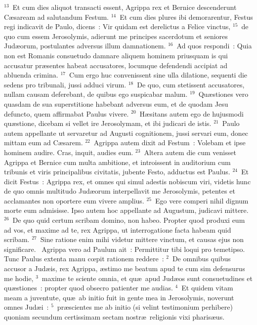 ${}^{13}$~Et cum dies aliquot transacti essent, Agrippa rex et Bernice descenderunt C\ae saream ad salutandum Festum.
${}^{14}$~Et cum dies plures ibi demorarentur, Festus regi indicavit de Paulo, dicens~: Vir quidam est derelictus a Felice vinctus,
${}^{15}$~de quo cum essem Jerosolymis, adierunt me principes sacerdotum et seniores Jud\ae orum, postulantes adversus illum damnationem.
${}^{16}$~Ad quos respondi~: Quia non est Romanis consuetudo damnare aliquem hominem priusquam is qui accusatur pr\ae sentes habeat accusatores, locumque defendendi accipiat ad abluenda crimina.
${}^{17}$~Cum ergo huc convenissent sine ulla dilatione, sequenti die sedens pro tribunali, jussi adduci virum.
${}^{18}$~De quo, cum stetissent accusatores, nullam causam deferebant, de quibus ego suspicabar malum.
${}^{19}$~Qu\ae stiones vero quasdam de sua superstitione habebant adversus eum, et de quodam Jesu defuncto, quem affirmabat Paulus vivere.
${}^{20}$~H\ae sitans autem ego de hujusmodi qu\ae stione, dicebam si vellet ire Jerosolymam, et ibi judicari de istis.
${}^{21}$~Paulo autem appellante ut servaretur ad Augusti cognitionem, jussi servari eum, donec mittam eum ad C\ae sarem.
${}^{22}$~Agrippa autem dixit ad Festum~: Volebam et ipse hominem audire. Cras, inquit, audies eum.
${}^{23}$~Altera autem die cum venisset Agrippa et Bernice cum multa ambitione, et introissent in auditorium cum tribunis et viris principalibus civitatis, jubente Festo, adductus est Paulus.
${}^{24}$~Et dicit Festus~: Agrippa rex, et omnes qui simul adestis nobiscum viri, videtis hunc de quo omnis multitudo Jud\ae orum interpellavit me Jerosolymis, petentes et acclamantes non oportere eum vivere amplius.
${}^{25}$~Ego vere comperi nihil dignum morte eum admisisse. Ipso autem hoc appellante ad Augustum, judicavi mittere.
${}^{26}$~De quo quid certum scribam domino, non habeo. Propter quod produxi eum ad vos, et maxime ad te, rex Agrippa, ut interrogatione facta habeam quid scribam.
${}^{27}$~Sine ratione enim mihi videtur mittere vinctum, et causas ejus non significare.
~Agrippa vero ad Paulum ait~: Permittitur tibi loqui pro temetipso. Tunc Paulus extenta manu cœpit rationem reddere~:
${}^{2}$~De omnibus quibus accusor a Jud\ae is, rex Agrippa, \ae stimo me beatum apud te cum sim defensurus me hodie,
${}^{3}$~maxime te sciente omnia, et qu\ae\ apud Jud\ae os sunt consuetudines et qu\ae stiones~: propter quod obsecro patienter me audias.
${}^{4}$~Et quidem vitam meam a juventute, qu\ae\ ab initio fuit in gente mea in Jerosolymis, noverunt omnes Jud\ae i~:
${}^{5}$~pr\ae scientes me ab initio (si velint testimonium perhibere) quoniam secundum certissimam sectam nostr\ae\ religionis vixi pharis\ae us.
